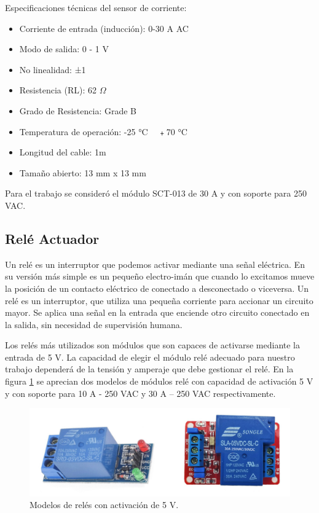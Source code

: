 Especificaciones técnicas del sensor de corriente:

\begin{itemize}
\item Corriente de entrada (inducción): 0-30 A AC
\item Modo de salida: 0 - 1 V
\item No linealidad: ±1%
\item Resistencia (RL): 62 $\Omega $
\item Grado de Resistencia: Grade B
\item Temperatura de operación: -25 °C ~ ﹢70 °C
\item Longitud del cable: 1m
\item Tamaño abierto: 13 mm x 13 mm
\end{itemize}

Para el trabajo se consideró el módulo SCT-013 de 30 A y con soporte para 250 VAC.

\subsection{Relé Actuador}

Un relé es un interruptor que podemos activar mediante una señal eléctrica. En su versión más simple es un pequeño electro-imán que cuando lo excitamos mueve la posición de un contacto eléctrico de conectado a desconectado o viceversa. Un relé es un interruptor, que utiliza una pequeña corriente para accionar un circuito mayor. Se aplica una señal en la entrada que enciende otro circuito conectado en la salida, sin necesidad de supervisión humana.

Los relés más utilizados son módulos que son capaces de activarse mediante la entrada de 5 V. La capacidad de elegir el módulo relé adecuado para nuestro trabajo dependerá de la tensión y amperaje que debe gestionar el relé. En la figura \ref{fig:rele} se aprecian dos modelos de módulos relé con capacidad de activación 5 V y con soporte para 10 A - 250 VAC y 30 A – 250 VAC respectivamente.


\begin{figure}[htbp]
	\centering
	\includegraphics[width=1.0\textwidth]{./Figures/rele.jpg}
	\caption{Modelos de relés con activación de 5 V.}

	\label{fig:rele}
\end{figure}

